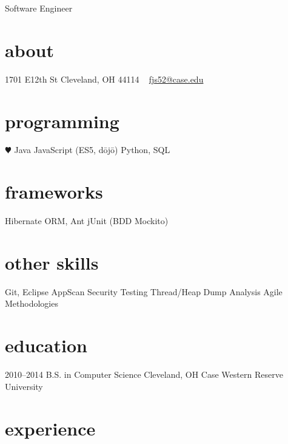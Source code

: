 \documentclass[]{friggeri-cv}
\begin{document}
       {Software Engineer}


\begin{aside}
  \section{about}
    1701 E12th St
    Cleveland, OH
    44114
    ~
    \href{mailto:fjs52@case.edu}{fjs52@case.edu}
  \section{programming}
    {\color{red} $\varheartsuit$} Java
    JavaScript
    (ES5, d\={o}j\={o})
    Python, SQL
  \section{frameworks}
    Hibernate ORM, Ant
    jUnit (BDD Mockito)
  \section{other skills}
    Git, Eclipse
    AppScan Security Testing
    Thread/Heap Dump Analysis
    Agile Methodologies
\end{aside}

\section{education}

\begin{entrylist}
  \entry
    {2010–2014}
    {B.S. in Computer Science}
    {Cleveland, OH}
    {Case Western Reserve University}
\end{entrylist}

\section{experience}
\end{document}
